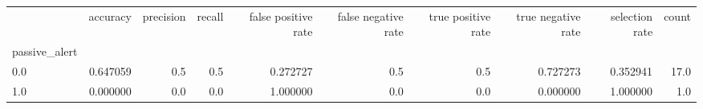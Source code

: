 \begin{tabular}{lrrrrrrrrr}
\toprule
{} &  accuracy &  precision &  recall &  false positive rate &  false negative rate &  true positive rate &  true negative rate &  selection rate &  count \\
passive\_alert &           &            &         &                      &                      &                     &                     &                 &        \\
\midrule
0.0           &  0.647059 &        0.5 &     0.5 &             0.272727 &                  0.5 &                 0.5 &            0.727273 &        0.352941 &   17.0 \\
1.0           &  0.000000 &        0.0 &     0.0 &             1.000000 &                  0.0 &                 0.0 &            0.000000 &        1.000000 &    1.0 \\
\bottomrule
\end{tabular}
